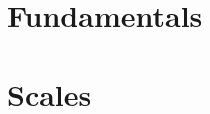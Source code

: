 \documentclass{book}
\begin{document}
    \chapter{Fundamentals}
    
    \chapter{Scales}
\end{document}
